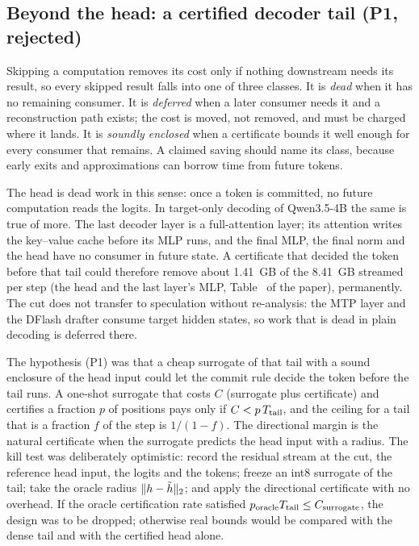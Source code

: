 \subsection{Beyond the head: a certified decoder tail (P1, rejected)}\label{app:tail}\label{sec:tail}\label{sec:skipped}
Skipping a computation removes its cost only if nothing downstream needs its result, so every skipped result falls into one of three classes. It is \emph{dead} when it has no remaining consumer. It is \emph{deferred} when a later consumer needs it and a reconstruction path exists; the cost is moved, not removed, and must be charged where it lands. It is \emph{soundly enclosed} when a certificate bounds it well enough for every consumer that remains. A claimed saving should name its class, because early exits and approximations can borrow time from future tokens.

The head is dead work in this sense: once a token is committed, no future computation reads the logits. In target-only decoding of Qwen3.5-4B the same is true of more. The last decoder layer is a full-attention layer; its attention writes the key--value cache before its MLP runs, and the final MLP, the final norm and the head have no consumer in future state. A certificate that decided the token before that tail could therefore remove about 1.41~GB of the 8.41~GB streamed per step (the head and the last layer's MLP, Table~ of the paper), permanently. The cut does not transfer to speculation without re-analysis: the MTP layer and the DFlash drafter consume target hidden states, so work that is dead in plain decoding is deferred there.

The hypothesis (P1) was that a cheap surrogate of that tail with a sound enclosure of the head input could let the commit rule decide the token before the tail runs. A one-shot surrogate that costs $C$ (surrogate plus certificate) and certifies a fraction $p$ of positions pays only if $C<p\,T_{\rm tail}$, and the ceiling for a tail that is a fraction $f$ of the step is $1/(1-f)$. The directional margin is the natural certificate when the surrogate predicts the head input with a radius. The kill test was deliberately optimistic: record the residual stream at the cut, the reference head input, the logits and the tokens; freeze an int8 surrogate of the tail; take the oracle radius $\lVert h-\tilde h\rVert_2$; and apply the directional certificate with no overhead. If the oracle certification rate satisfied $p_{\rm oracle}T_{\rm tail}\le C_{\rm surrogate}$, the design was to be dropped; otherwise real bounds would be compared with the dense tail and with the certified head alone.

